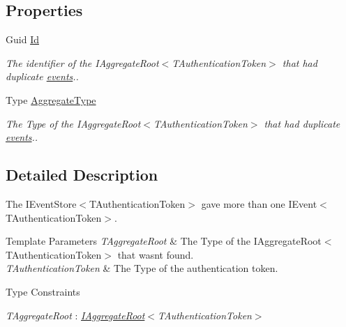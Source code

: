 \subsection*{Properties}
\begin{DoxyCompactItemize}
\item 
Guid \hyperlink{classCqrs_1_1Domain_1_1Exceptions_1_1DuplicateEventException_a1ef6073cd60173f3f807472d284e1bc1_a1ef6073cd60173f3f807472d284e1bc1}{Id}
\begin{DoxyCompactList}\small\item\em The identifier of the I\+Aggregate\+Root$<$\+T\+Authentication\+Token$>$ that had duplicate \hyperlink{}{events}.. \end{DoxyCompactList}\item 
Type \hyperlink{classCqrs_1_1Domain_1_1Exceptions_1_1DuplicateEventException_a09563fe13fc02d98992878223da8f9a8_a09563fe13fc02d98992878223da8f9a8}{Aggregate\+Type}
\begin{DoxyCompactList}\small\item\em The Type of the I\+Aggregate\+Root$<$\+T\+Authentication\+Token$>$ that had duplicate \hyperlink{}{events}.. \end{DoxyCompactList}\end{DoxyCompactItemize}


\subsection{Detailed Description}
The I\+Event\+Store$<$\+T\+Authentication\+Token$>$ gave more than one I\+Event$<$\+T\+Authentication\+Token$>$. 


\begin{DoxyTemplParams}{Template Parameters}
{\em T\+Aggregate\+Root} & The Type of the I\+Aggregate\+Root$<$\+T\+Authentication\+Token$>$ that wasn\textquotesingle{}t found.\\
\hline
{\em T\+Authentication\+Token} & The Type of the authentication token.\\
\hline
\end{DoxyTemplParams}
\begin{Desc}
\item[Type Constraints]\begin{description}
\item[{\em T\+Aggregate\+Root} : {\em \hyperlink{interfaceCqrs_1_1Domain_1_1IAggregateRoot}{I\+Aggregate\+Root}$<$T\+Authentication\+Token$>$}]\end{description}
\end{Desc}


